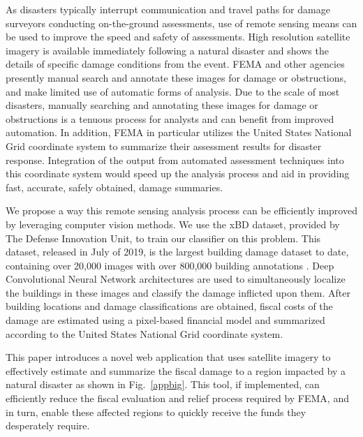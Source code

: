 \documentclass[conference]{IEEEtran}
\begin{document}
 As disasters typically interrupt communication and travel paths for damage surveyors conducting on-the-ground assessments, use of remote sensing means can be used to improve the speed and safety of assessments. High resolution satellite imagery is available immediately following a natural disaster and shows the details of specific damage conditions from the event. FEMA and other agencies presently manual search and annotate these images for damage or obstructions, and make limited use of automatic forms of analysis.  Due to the scale of most disasters, manually searching and annotating these images for damage or obstructions is a tenuous process for analysts and can benefit from improved automation. In addition, FEMA in particular utilizes the United States National Grid coordinate system to summarize their assessment results for disaster response. Integration of the output from automated assessment techniques into this coordinate system would speed up the analysis process and aid in providing fast, accurate, safely obtained, damage summaries.  
 


We propose a way this remote sensing analysis process can be efficiently improved by leveraging computer vision methods. We use the xBD dataset, provided by The Defense Innovation Unit, to train our classifier on this problem. This dataset, released in July of 2019, is the largest building damage dataset to date, containing over 20,000 images with over 800,000 building annotations \cite{a1}. Deep Convolutional Neural Network architectures are used to simultaneously localize the buildings in these images and classify the damage inflicted upon them. After building locations and damage classifications are obtained, fiscal costs of the damage are estimated using a pixel-based financial model and summarized according to the United States National Grid coordinate system.

This paper introduces a novel web application that uses satellite imagery to effectively estimate and summarize the fiscal damage to a region impacted by a natural disaster as shown in Fig.~\ref{appbig}. This tool, if implemented, can efficiently reduce the fiscal evaluation and relief process required by FEMA, and in turn, enable these affected regions to quickly receive the funds they desperately require.
\end{document}

